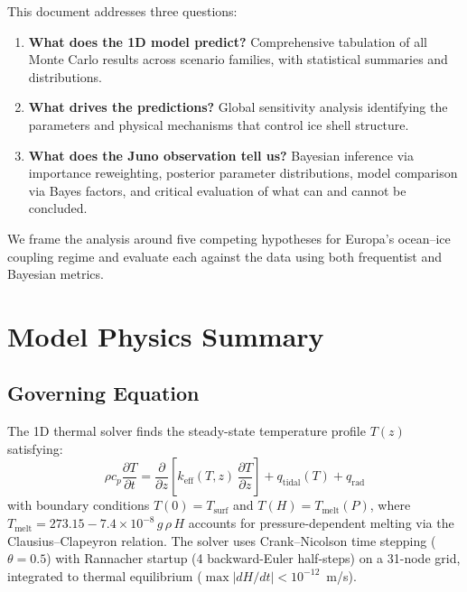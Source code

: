 \documentclass[11pt,letterpaper]{article}
\begin{document}
This document addresses three questions:
\begin{enumerate}
  \item \textbf{What does the 1D model predict?} Comprehensive tabulation of all Monte Carlo results across scenario families, with statistical summaries and distributions.
  \item \textbf{What drives the predictions?} Global sensitivity analysis identifying the parameters and physical mechanisms that control ice shell structure.
  \item \textbf{What does the Juno observation tell us?} Bayesian inference via importance reweighting, posterior parameter distributions, model comparison via Bayes factors, and critical evaluation of what can and cannot be concluded.
\end{enumerate}

We frame the analysis around five competing hypotheses for Europa's ocean--ice coupling regime and evaluate each against the data using both frequentist and Bayesian metrics.


\section{Model Physics Summary}
\label{sec:physics}

\subsection{Governing Equation}

The 1D thermal solver finds the steady-state temperature profile $T(z)$ satisfying:
\begin{equation}
  \rho c_p \frac{\partial T}{\partial t}
  = \frac{\partial}{\partial z}\!\left[k_\mathrm{eff}(T,z)\,\frac{\partial T}{\partial z}\right]
  + q_\mathrm{tidal}(T) + q_\mathrm{rad}
  \label{eq:heat}
\end{equation}
with boundary conditions $T(0) = T_\mathrm{surf}$ and $T(H) = T_\mathrm{melt}(P)$, where $T_\mathrm{melt} = 273.15 - 7.4 \times 10^{-8}\,g\,\rho\,H$ accounts for pressure-dependent melting via the Clausius--Clapeyron relation. The solver uses Crank--Nicolson time stepping ($\theta = 0.5$) with Rannacher startup (4 backward-Euler half-steps) on a 31-node grid, integrated to thermal equilibrium ($\max |dH/dt| < 10^{-12}$~m/s).
\end{document}
